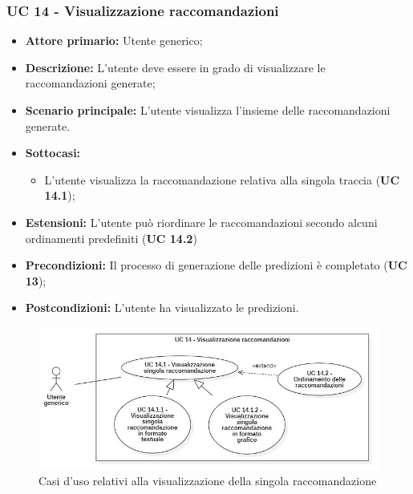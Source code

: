 \subsubsection{UC 14 - Visualizzazione raccomandazioni}
\begin{itemize}
	\item \textbf{Attore primario:} Utente generico;
	\item \textbf{Descrizione:} L'utente deve essere in grado di visualizzare le raccomandazioni generate;
	\item \textbf{Scenario principale:} L'utente visualizza l'insieme delle raccomandazioni generate.

	\item \textbf{Sottocasi:}
		\begin{itemize}
			\item L'utente visualizza la raccomandazione relativa alla singola traccia (\textbf{UC 14.1});
		\end{itemize}
		
	\item \textbf{Estensioni:} L'utente può riordinare le raccomandazioni secondo alcuni ordinamenti predefiniti (\textbf{UC 14.2})
	\item \textbf{Precondizioni:} Il processo di generazione delle predizioni è completato (\textbf{UC 13});
	\item \textbf{Postcondizioni:} L'utente ha visualizzato le predizioni.
\end{itemize}

\begin{figure}[H]
    \centering
    \includegraphics[scale=0.6]{immagini/usecase/cd10.JPG}
    \caption{Casi d'uso relativi alla visualizzazione della singola raccomandazione}
\end{figure}

